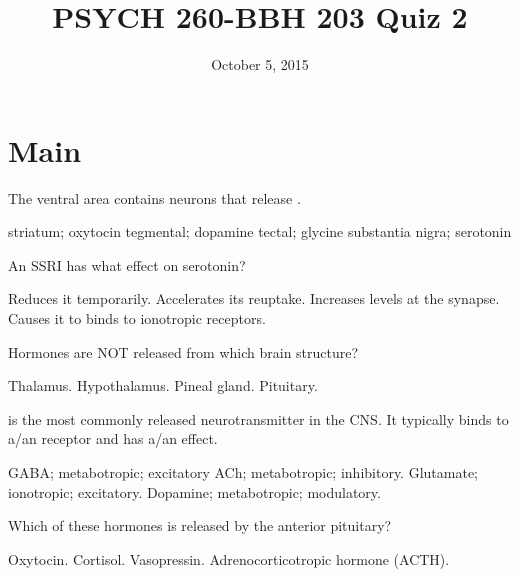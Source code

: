 \documentclass[answers]{exam}
\title{PSYCH 260-BBH 203 Quiz 2}
\author{}
\date{October 5, 2015}
\begin{document}
\maketitle

\begin{center}
\end{center}
\vspace{0.1in}

\newpage

\section{Main}

\begin{questions}

\question The ventral \fillin area contains neurons that release \fillin.
\begin{choices}
\choice striatum; oxytocin
\correctchoice tegmental; dopamine 
\choice tectal; glycine
\choice substantia nigra; serotonin
\end{choices}

\question An SSRI has what effect on serotonin?
\begin{choices}
\choice Reduces it temporarily.
\choice Accelerates its reuptake.
\correctchoice Increases levels at the synapse.
\choice Causes it to binds to ionotropic receptors.
\end{choices}

\question Hormones are NOT released from which brain structure?
\begin{choices}
\correctchoice Thalamus.
\choice Hypothalamus.
\choice Pineal gland.
\choice Pituitary.
\end{choices}

\question \fillin is the most commonly released neurotransmitter in the CNS. It typically binds to a/an \fillin receptor and has a/an \fillin effect.
\begin{choices}
\choice GABA; metabotropic; excitatory
\choice ACh; metabotropic; inhibitory.
\correctchoice Glutamate; ionotropic; excitatory.
\choice Dopamine; metabotropic; modulatory.
\end{choices}

\question Which of these hormones is released by the anterior pituitary?
\begin{choices}
\choice Oxytocin.
\choice Cortisol.
\choice Vasopressin.
\correctchoice Adrenocorticotropic hormone (ACTH).
\end{choices}


\end{questions}
\end{document}
